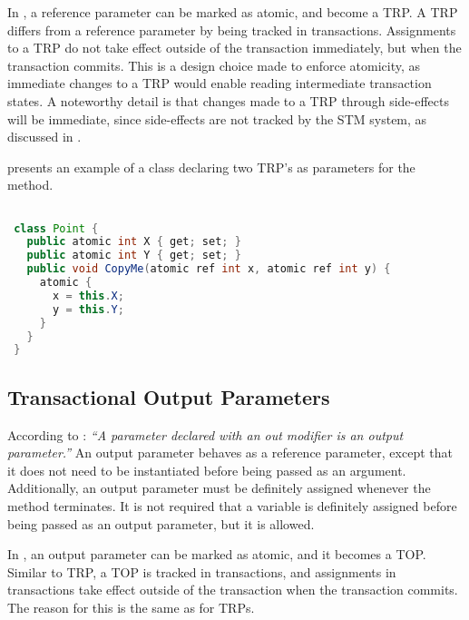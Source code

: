 In \stmname, a reference parameter can be marked as atomic, and become a \ac{TRP}. A \ac{TRP} differs from a reference parameter by being tracked in transactions. Assignments to a \ac{TRP} do not take effect outside of the transaction immediately, but when the transaction commits. This is a design choice made to enforce atomicity, as immediate changes to a \ac{TRP} would enable reading intermediate transaction states. A noteworthy detail is that changes made to a \ac{TRP} through side-effects will be immediate, since side-effects are not tracked by the \ac{STM} system, as discussed in .

 presents an example of a  class declaring two \ac{TRP}'s as parameters for the  method.

\begin{lstlisting}[label=lst:atomic_ref,
 caption={Transactional Reference Parameter},
 language=Java, 
 showspaces=false,
 showtabs=false,
 breaklines=true,
 showstringspaces=false,
 breakatwhitespace=true,
 commentstyle=\color{greencomments},
 keywordstyle=\color{bluekeywords},
 stringstyle=\color{redstrings},
 morekeywords={atomic, retry, orElse, var, get, set, ref, out}]  % Start your code-block

 class Point {
   public atomic int X { get; set; }
   public atomic int Y { get; set; }
   public void CopyMe(atomic ref int x, atomic ref int y) {
     atomic {
       x = this.X;
       y = this.Y;
     }
   }   
 }
\end{lstlisting}

\subsection{Transactional Output Parameters}
\label{subsec:stm_desgin_out_parameters}
According to \cite[p. 97]{csharp2013specificaiton}: \textit{``A parameter declared with an out modifier is an output parameter.''} An output parameter behaves as a reference parameter, except that it does not need to be instantiated before being passed as an argument. Additionally, an output parameter must be definitely assigned whenever the method terminates\cite[p. 42]{sestoft2011c}. It is not required that a variable is definitely assigned before being passed as an output parameter, but it is allowed.

In \stmname, an output parameter can be marked as atomic, and it becomes a \ac{TOP}. Similar to \ac{TRP}, a \ac{TOP} is tracked in transactions, and assignments in transactions take effect outside of the transaction when the transaction commits. The reason for this is the same as for \acp{TRP}.

